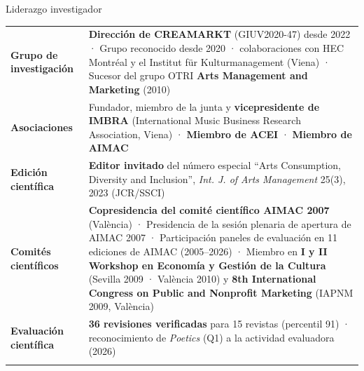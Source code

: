 \documentclass[
  8pt,
  ignorenonframetext,
  aspectratio=169,
  spanish,
]{beamer}
\newcommand{\lightrowrule}{\arrayrulecolor{black!25}\specialrule{0.4pt}{1pt}{1pt}\arrayrulecolor{black}}
\begin{document}
\begin{frame}{Liderazgo investigador}
\label{liderazgo-investigador}
~

\begin{longtable}[]{@{}
  >{\raggedright\arraybackslash}p{}
  >{\raggedright\arraybackslash}p{}@{}}
\toprule\noalign{}
\endhead
\bottomrule\noalign{}
\endlastfoot
\textbf{Grupo de investigación} & \textbf{Dirección de CREAMARKT}
(GIUV2020-47) desde 2022 · Grupo reconocido desde 2020 · colaboraciones
con HEC Montréal y el Institut für Kulturmanagement (Viena) · Sucesor
del grupo OTRI \textbf{Arts Management and Marketing} (2010) \\ \lightrowrule
\textbf{Asociaciones} & Fundador, miembro de la junta y
\textbf{vicepresidente de IMBRA} (International Music Business Research
Association, Viena) · \textbf{Miembro de ACEI} · \textbf{Miembro de
AIMAC} \\ \lightrowrule
\textbf{Edición científica} & \textbf{Editor invitado} del número
especial ``Arts Consumption, Diversity and Inclusion'', \emph{Int. J. of
Arts Management} 25(3), 2023 (JCR/SSCI) \\ \lightrowrule
\textbf{Comités científicos} & \textbf{Copresidencia del comité
científico AIMAC 2007} (València) · Presidencia de la sesión plenaria de
apertura de AIMAC 2007 · Participación paneles de evaluación en 11
ediciones de AIMAC (2005--2026) · Miembro en \textbf{I y II Workshop en
Economía y Gestión de la Cultura} (Sevilla 2009 · València 2010) y
\textbf{8th International Congress on Public and Nonprofit Marketing}
(IAPNM 2009, València) \\ \lightrowrule
\textbf{Evaluación científica} & \textbf{36 revisiones verificadas} para
15 revistas (percentil 91) · reconocimiento de \emph{Poetics} (Q1) a la
actividad evaluadora (2026) \\ \lightrowrule
\end{longtable}

\end{frame}
\end{document}
